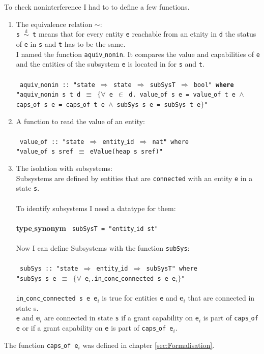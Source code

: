 \documentclass[11pt,a4paper,twoside]{article}
\begin{document}
{	To check noninterference I had to to define a few functions. \\
	\begin{enumerate}
	\item The equivalence  relation $\sim$: \\
	\texttt{s $\overset{\text{d}}{\sim}$ t} means that for every entity \texttt{e} reachable from an etnity in \texttt{d} the status of \texttt{e} in \texttt{s} and \texttt{t} has to be the same. \\
I named the function \texttt{aquiv$\_$nonin}. It compares the value and capabilities of \texttt{e} and the entities of the subsystem \texttt{e} is located in for \texttt{s} and \texttt{t}. \\ \\
{
\texttt{
aquiv$\_$nonin :: "state $\Rightarrow$ state $\Rightarrow$ subSysT $\Rightarrow$ bool" \textbf{where} \\
"aquiv$\_$nonin s t d $\equiv$ $\{\forall$ e $\in$ d. value$\_$of s e = value$\_$of t e $\wedge$ caps$\_$of s e = caps$\_$of t e $\wedge$ subSys s e = subSys t e$\}$"}} \\
\item A function to read the value of an entity: \\ \\
{
\texttt{
value$\_$of :: "state $\Rightarrow$ entity$\_$id $\Rightarrow$ nat" where \\
"value$\_$of s sref $\equiv$ eValue(heap s sref)"}} \\
\item The isolation with subsystems: \\
Subsystems are defined by entities that are \texttt{connected} with an entity \texttt{e} in a state \texttt{s}. \\ \\
To identify subsystems I need a datatype for them: \\ \\
{\textbf{type$\_$synonym}
\texttt{
subSysT = "entity$\_$id st"}} \\ \\
Now I can define Subsystems with the function \texttt{subSys}: \\ \\
{
\texttt{
subSys :: "state $\Rightarrow$ entity$\_$id $\Rightarrow$ subSysT" where \\ 
"subSys s e $\equiv$ $\{\forall$ e$_i$.in$\_$conc$\_$connected s e e$_i\}$"}} \\ \\
\texttt{in$\_$conc$\_$connected s e e$_i$} is true for entities \texttt{e} and \textbf{e$_i$} that are connected in state s. \\
\texttt{e} and \textbf{e$_i$} are connected in state \texttt{s} if a grant capability on \texttt{e$_i$} is part of \texttt{caps$\_$of e} or if a grant capability on \texttt{e} is part of \texttt{caps$\_$of e$_i$}.
\end{enumerate} 
The function \texttt{caps$\_$of e$_i$} was defined in chapter \ref{sec:Formalisation}. 
\newpage
}
\end{document}

